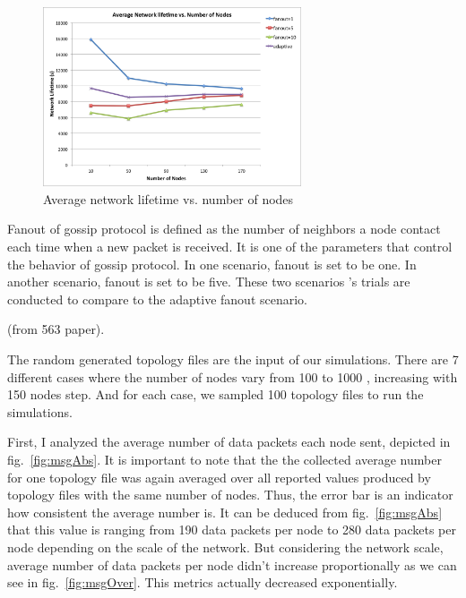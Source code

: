 \begin{figure}
	\centering
	\includegraphics[width=3in]{life.png}
	\caption{Average network lifetime vs. number of nodes}
	\label{fig:life}
\end{figure}



Fanout of gossip protocol is defined as the number of neighbors a node contact each time when a new packet is received. It is one of the parameters that control the behavior of gossip protocol. In one scenario, fanout is set to be one. In another scenario, fanout is set to be five. These two scenarios 's trials are conducted to compare to the adaptive fanout scenario. 

(from 563 paper).

The random generated topology files are the input of our simulations. There are 7 different cases where the number of nodes vary from 100 to 1000 , increasing with 150 nodes step. And for each case, we sampled 100 topology files to run the simulations.

First, I analyzed the average number of data packets each node sent, depicted in fig.~\ref{fig:msgAbs}. It is important to note that the the collected average number for one topology file was again averaged over all reported values produced by topology files with the same number of nodes. Thus, the error bar is an indicator how consistent the average number is. It can be deduced from fig.~\ref{fig:msgAbs} that this value is ranging from 190 data packets per node to 280 data packets per node depending on the scale of the network. But considering the network scale, average number of data packets per node didn't increase proportionally as we can see in fig.~\ref{fig:msgOver}. This metrics actually decreased exponentially. 

%
%

